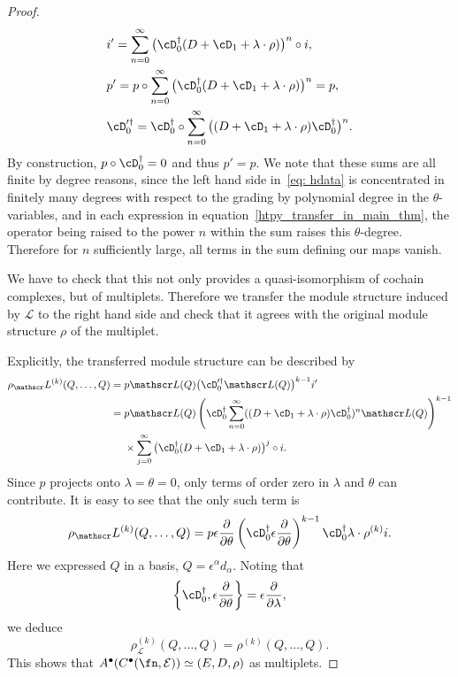 \documentclass[10pt,a4paper]{amsart}
\numberwithin{equation}{section}
\def\cE{\mathcal E}\def\cF{\mathcal F}\def\cG{\mathcal G}\def\cH{\mathcal H}
\def\bu{\bullet}
\def\sL{\mathscr L}
\begin{document}
\begin{proof}
	\begin{align}
	&i' = \sum_{n=0}^{\infty} \big(\cD_0^\dagger(D + \cD_1 + \lambda \cdot \rho)\big)^n \circ i,\nonumber \\
	&p' = p \circ \sum_{n=0}^{\infty} \big(\cD_0^\dagger(D + \cD_1 + \lambda \cdot \rho)\big)^n = p,\nonumber \\
	&\cD_0'^\dagger = \cD_0^\dagger \circ \sum_{n = 0}^{\infty} \big((D + \cD_1 + \lambda \cdot \rho) \cD_0^\dagger\big)^n.	\label{htpy_transfer_in_main_thm}
	\end{align}
	By construction, $p \circ \cD_0^\dagger = 0$ and thus $p' = p$. We note that these sums are all finite by degree reasons, since the left hand side in~\eqref{eq: hdata} is concentrated in finitely many degrees with respect to the grading by polynomial degree in the $\theta$-variables, and in each expression in equation~\eqref{htpy_transfer_in_main_thm}, the operator being raised to the power $n$ within the sum raises this $\theta$-degree. Therefore for $n$ sufficiently large, all terms in the sum defining our maps vanish.
	
	We have to check that this not only provides a quasi-isomorphism of cochain complexes, but of multiplets. Therefore we transfer the module structure induced by $\sL$ to the right hand side and check that it agrees with the original module structure $\rho$ of the multiplet.
	
	Explicitly, the transferred module structure can be described by
	\begin{align*}
	\rho_\sL^{(k)} (Q,\dots,Q)={}& p \sL(Q) \big(\cD_0'^\dagger \sL(Q)\big)^{k-1} i' \\
	={}&p \sL(Q) \left(\cD_0^\dagger \sum_{n = 0}^{\infty} ((D + \cD_1 + \lambda \cdot \rho) \cD_0^\dagger)^n \sL(Q)\right)^{k-1}\\
&{}\times \sum_{j=0}^{\infty} \big(\cD_0^\dagger(D + \cD_1 + \lambda \cdot \rho)\big)^j \circ i .
	\end{align*}
	Since $p$ projects onto $\lambda = \theta = 0$, only terms of order zero in $\lambda$ and $\theta$ can contribute. It is easy to see that the only such term is
	\begin{equation*}
	\rho_\sL^{(k)} (Q,\dots,Q) = p \epsilon \frac{\partial}{\partial \theta} \left(\cD_0^\dagger \epsilon \frac{\partial}{\partial \theta}\right)^{k-1} \cD_0^\dagger \lambda \cdot \rho^{(k)} i .
	\end{equation*}
	Here we expressed $Q$ in a basis, $Q = \epsilon^\alpha d_\alpha$.
	Noting that
	\begin{equation*}
	\left\{\cD_0^\dagger , \epsilon \frac{\partial}{\partial \theta}\right\} = \epsilon \frac{\partial}{\partial \lambda} ,
	\end{equation*}
	we deduce
	\begin{equation*}
	\rho_\sL^{(k)} (Q,\dots,Q) = \rho^{(k)} (Q,\dots,Q) .
	\end{equation*}
	This shows that $A^\bu(C^\bu(\fn , \cE)) \simeq (E,D,\rho)$ as multiplets.
	

\end{proof}
\end{document}
